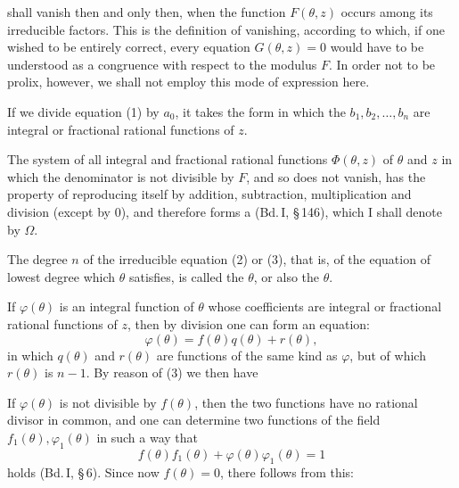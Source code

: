 shall vanish then and only then, when the function $F(\theta,z)$ occurs among its irreducible factors. This is the definition of vanishing, according to which, if one wished to be entirely correct, every equation $G(\theta,z) = 0$ would have to be understood as a congruence with respect to the modulus $F$. In order not to be prolix, however, we shall not employ this mode of expression here.

If we divide equation (1) by $a_0$, it takes the form
in which the $b_1, b_2, \ldots, b_n$ are integral or fractional rational functions of $z$.

The system of all integral and fractional rational functions $\Phi(\theta,z)$ of $\theta$ and $z$ in which the denominator is not divisible by $F$, and so does not vanish, has the property of reproducing itself by addition, subtraction, multiplication and division (except by 0), and therefore forms a  (Bd.\,I, \S\,146), which I shall denote by $\Omega$.

The degree $n$ of the irreducible equation (2) or (3), that is, of the equation of lowest degree which $\theta$ satisfies, is called the  $\theta$, or also the  $\theta$.

If $\varphi(\theta)$ is an integral function of $\theta$ whose coefficients are integral or fractional rational functions of $z$, then by division one can form an equation:
\[
\varphi(\theta) = f(\theta)q(\theta) + r(\theta),
\]
in which $q(\theta)$ and $r(\theta)$ are functions of the same kind as $\varphi$, but of which $r(\theta)$ is  $n-1$. By reason of (3) we then have

If $\varphi(\theta)$ is not divisible by $f(\theta)$, then the two functions have no rational divisor in common, and one can determine two functions of the field $f_1(\theta), \varphi_1(\theta)$ in such a way that
\[
f(\theta)f_1(\theta) + \varphi(\theta)\varphi_1(\theta) = 1
\]
holds (Bd.\,I, \S\,6). Since now $f(\theta) = 0$, there follows from this:
